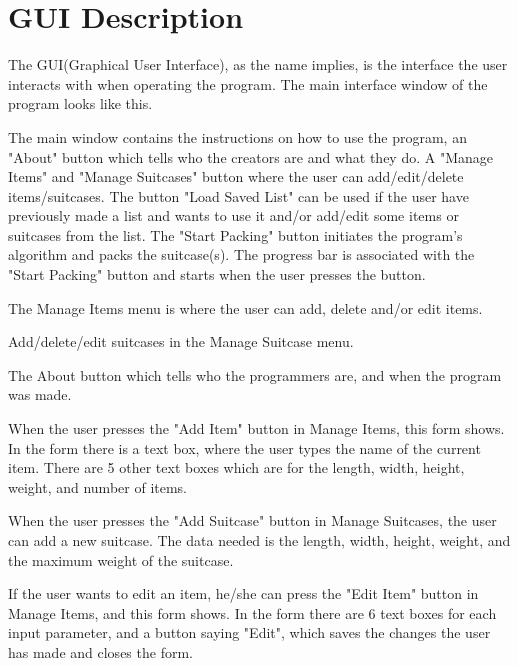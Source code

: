 \section{GUI Description}
\label{sec:GUI}
The GUI(Graphical User Interface), as the name implies, is the interface the user interacts with when operating the program.
The main interface window of the program looks like this.


The main window contains the instructions on how to use the program, an "About" button which tells who the creators are and what they do. A "Manage Items" and "Manage Suitcases" button where the user can add/edit/delete items/suitcases. The button "Load Saved List" can be used if the user have previously made a list and wants to use it and/or add/edit some items or suitcases from the list. The "Start Packing" button initiates the program's algorithm and packs the suitcase(s). The progress bar is associated with the "Start Packing" button and starts when the user presses the button.

The Manage Items menu is where the user can add, delete and/or edit items.

Add/delete/edit suitcases in the Manage Suitcase menu.

The About button which tells who the programmers are, and when the program was made.

When the user presses the "Add Item" button in Manage Items, this form shows. In the form there is a text box, where the user types the name of the current item. There are 5 other text boxes which are for the length, width, height, weight, and number of items.

When the user presses the "Add Suitcase" button in Manage Suitcases, the user can add a new suitcase. The data needed is the length, width, height, weight, and the maximum weight of the suitcase. 

If the user wants to edit an item, he/she can press the "Edit Item" button in Manage Items, and this form shows. In the form there are 6 text boxes for each input parameter, and a button saying "Edit", which saves the changes the user has made and closes the form.

